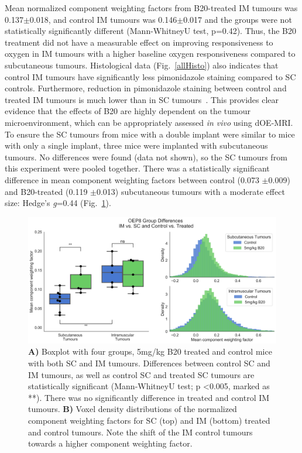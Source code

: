 Mean normalized component weighting factors from B20-treated IM tumours was 0.137$\pm$0.018, and control IM tumours was 0.146$\pm$0.017 and the groups were not statistically significantly different (Mann-WhitneyU test, p=0.42). 
Thus, the B20 treatment did not have a measurable effect on improving responsiveness to oxygen in IM tumours with a higher baseline oxygen responsiveness compared to subcutaneous tumours.
Histological data (Fig.~\ref{allHisto}) also indicates that control IM tumours have significantly less pimonidazole staining compared to SC controls.
Furthermore, reduction in pimonidazole staining between control and treated IM tumours is much lower than in SC tumours~. 
This provides clear evidence that the effects of B20 are highly dependent on the tumour microenvironment, which can be appropriately assessed \emph{in vivo} using dOE-MRI.
To ensure the SC tumours from mice with a double implant were similar to mice with only a single implant, three mice were implanted with subcutaneous tumours.
No differences were found (data not shown), so the SC tumours from this experiment were pooled together.
There was a statistically significant difference in mean component weighting factors between control (0.073 $\pm$0.009) and B20-treated (0.119 $\pm$0.013) subcutaneous tumours with a moderate effect size: Hedge's \emph{g}=0.44 (Fig.~\ref{OEP8boxplot}).

\begin{figure}[htbp]
   \centering
   \includegraphics[width=\textwidth]{oemri_thesis3/oemri_thesis3-images/4_oep8_IMSC_b20_sanitized_dOEMRI.png} %
   \caption{\textbf{A)} Boxplot with four groups, 5mg/kg B20 treated and control mice with both SC and IM tumours.
   Differences between control SC and IM tumours, as well as control SC and treated SC tumours are statistically significant (Mann-WhitneyU test; p <0.005, marked as **).
   There was no significantly difference in treated and control IM tumours.
   \textbf{B)} Voxel density distributions of the normalized component weighting factors for SC (top) and IM (bottom) treated and control tumours.
   Note the shift of the IM control tumours towards a higher component weighting factor.}
   \label{OEP8boxplot}
\end{figure}

